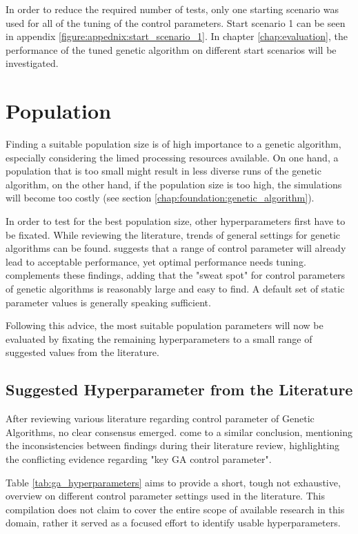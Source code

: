 In order to reduce the required number of tests, only one starting scenario was used for all of the tuning of the control parameters. Start scenario 1 can be seen in appendix \ref{figure:appednix:start_scenario_1}. In chapter \ref{chap:evaluation}, the performance of the tuned genetic algorithm on different start scenarios will be investigated.

\section{Population}
\label{chap:hyperparameter_tuning:population}
Finding a suitable population size is of high importance to a genetic algorithm, especially considering the limed processing resources available. On one hand, a population that is too small might result in less diverse runs of the genetic algorithm, on the other hand, if the population size is too high, the simulations will become too costly (see section \ref{chap:foundation:genetic_algorithm}).

In order to test for the best population size, other hyperparameters first have to be fixated. While reviewing the literature, trends of general settings for genetic algorithms can be found. 
\cite{grefenstette_optimization_1986} suggests that a range of control parameter will already lead to acceptable performance, yet optimal performance needs tuning. \cite{kacprzyk_parameter_2007} complements these findings, adding that the "sweat spot" for control parameters of genetic algorithms is reasonably large and easy to find. A default set of static parameter values is generally speaking sufficient.

Following this advice, the most suitable population parameters will now be evaluated by fixating the remaining hyperparameters to a small range of suggested values from the literature.

\subsection{Suggested Hyperparameter from the Literature}
After reviewing various literature regarding control parameter of Genetic Algorithms, no clear consensus emerged. \cite{mills_determining_2015} come to a similar conclusion, mentioning the inconsistencies between findings during their literature review, highlighting the conflicting evidence regarding "key GA control parameter".

Table \ref{tab:ga_hyperparameters} aims to provide a short, tough not exhaustive, overview on different control parameter settings used in the literature. This compilation does not claim to cover the entire scope of available research in this domain, rather it served as a focused effort to identify usable hyperparameters.


